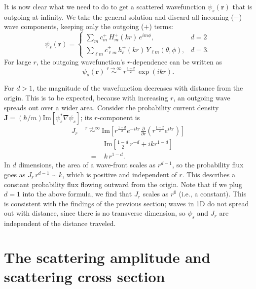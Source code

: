 \documentclass[pra,12pt]{revtex4}
\begin{document}
It is now clear what we need to do to get a scattered wavefunction
$\psi_s(\mathbf{r})$ that is outgoing at infinity.  We take the
general solution and discard all incoming ($-$) wave components,
keeping only the outgoing ($+$) terms:
\begin{equation}
  \psi_s(\mathbf{r}) = \begin{cases} \displaystyle\sum_{m} c_m^+\,H_m^+(kr)\,e^{im\phi}, &d=2\\ \displaystyle\sum_{\ell m} c_{\ell m}^+\,h_\ell^+(kr)\,Y_{\ell m}(\theta,\phi),&d=3.\end{cases}
\end{equation}
For large $r$, the outgoing wavefunction's $r$-dependence can be
written as
\begin{equation}
  \psi_s(\mathbf{r}) \; \overset{r\rightarrow\infty}{\sim} \; r^{\frac{1-d}{2}} \,\exp\left(ikr\right).
\end{equation}

For $d > 1$, the magnitude of the wavefunction decreases with distance
from the origin.  This is to be expected, because with increasing $r$,
an outgoing wave spreads out over a wider area.  Consider the
probability current density $\mathbf{J} = (\hbar/m)
\mathrm{Im}\left[\psi_s^*\nabla\psi_s\right]$; its $r$-component is
\begin{equation}
  \begin{aligned}J_r \; &\overset{r\rightarrow\infty}{\sim} \; \mathrm{Im}\left[r^{\frac{1-d}{2}} e^{-ikr} \frac{\partial}{\partial r}\left(r^{\frac{1-d}{2}} e^{ikr}\right)\right] \\ &\;\;=\;\;\;\mathrm{Im}\left[\frac{1-d}{2}\, r^{-d} + ik r^{1-d}\right]\\ &\;\;=\;\;\; k \,r^{1-d}.\end{aligned}
\end{equation}
In $d$ dimensions, the area of a wave-front scales as $r^{d-1}$, so
the probability flux goes as $J_r \,r^{d-1} \sim k$, which is
positive and independent of $r$.  This describes a constant
probability flux flowing outward from the origin.  Note that if we
plug $d=1$ into the above formula, we find that $J_r$ scales as $r^0$
(i.e., a constant).  This is consistent with the findings of the
previous section; waves in 1D do not spread out with distance, since
there is no transverse dimension, so $\psi_s$ and $J_r$ are
independent of the distance traveled.

\section{The scattering amplitude and scattering cross section}
\label{sec:scattering_amplitude}
\end{document}
